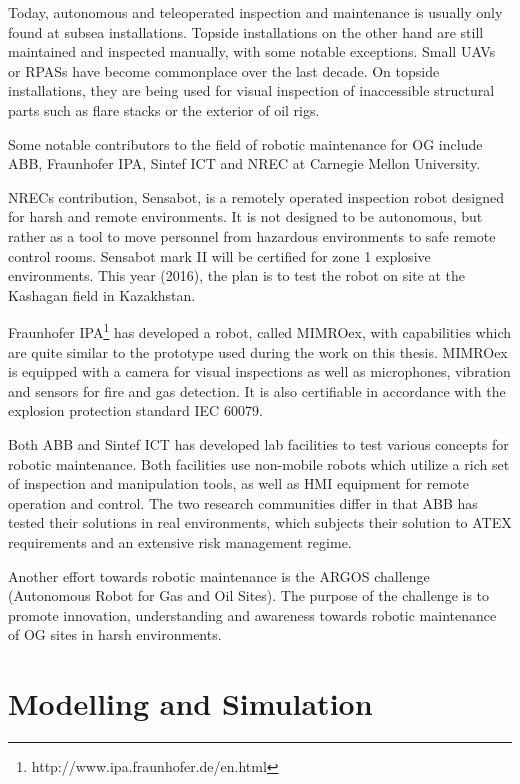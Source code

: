 Today, autonomous and teleoperated inspection and maintenance is usually only found at subsea installations. Topside installations on the other hand are still maintained and inspected manually, with some notable exceptions. Small \acp{UAV} or \acp{RPAS} have become commonplace over the last decade. On topside installations, they are being used for visual inspection of inaccessible structural parts such as flare stacks or the exterior of oil rigs.

Some notable contributors to the field of robotic maintenance for \ac{OG} include ABB, \ac{Fraunhofer IPA}, Sintef ICT\cite{sintef_robot_consept} and NREC  at  Carnegie
Mellon University. 

NRECs contribution, Sensabot, is a remotely operated inspection robot designed for harsh and remote environments\cite{deploymentsensabot}. It is not designed to be autonomous, but rather as a tool to move personnel from hazardous environments to safe remote control rooms. Sensabot mark II will be certified for zone 1 explosive environments. This year (2016), the plan is to test the robot on site at the Kashagan field in Kazakhstan\cite{peerless2016robot}.

\ac{Fraunhofer IPA}\footnote{http://www.ipa.fraunhofer.de/en.html} has developed a robot, called \ac{MIMROex}, with capabilities which are quite similar to the prototype used during the work on this thesis. \ac{MIMROex} is equipped with a camera for visual inspections as well as microphones, vibration and sensors for fire and gas detection. It is also certifiable in accordance with the explosion protection standard IEC 60079\cite{MIMROex}. 

Both ABB and Sintef ICT has developed lab facilities to test various concepts for robotic maintenance. Both facilities use non-mobile robots which utilize a rich set of inspection and manipulation tools, as well as \ac{HMI} equipment for remote operation and control. The two research communities differ in that ABB has tested their solutions in real environments, which subjects their solution to ATEX requirements and an extensive risk management regime\cite{StepwiseApproachToRobotics}. 

Another effort towards robotic maintenance is the ARGOS challenge (Autonomous Robot for Gas and Oil Sites). The purpose of the challenge is to promote innovation, understanding and awareness towards robotic maintenance of \ac{OG} sites in harsh environments\cite{ARGOS}.

\section{Modelling and Simulation}

